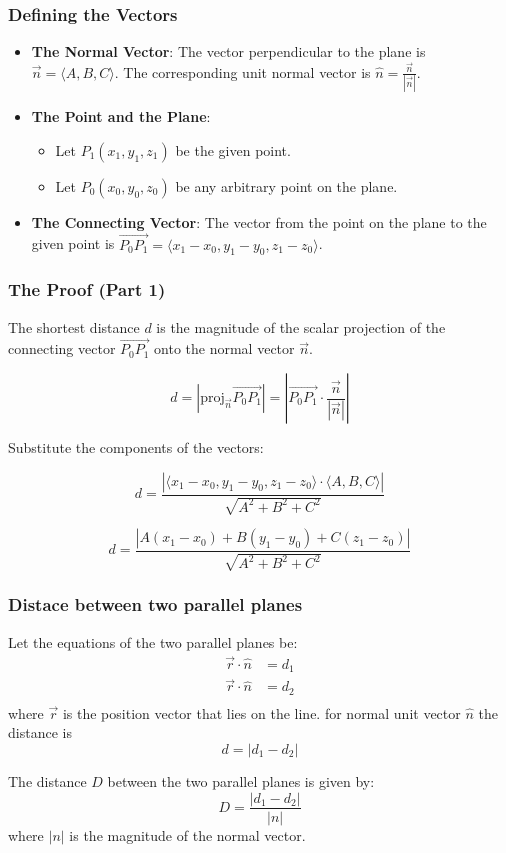 \begin{frame}
    \frametitle{Defining the Vectors}
    \begin{itemize}
        \item \textbf{The Normal Vector}: The vector perpendicular to the plane is $\vec{n} = \langle A, B, C \rangle$. The corresponding unit normal vector is $\hat{n} = \frac{\vec{n}}{|\vec{n}|}$.
        \item \textbf{The Point and the Plane}:
        \begin{itemize}
            \item Let $P_1(x_1, y_1, z_1)$ be the given point.
            \item Let $P_0(x_0, y_0, z_0)$ be any arbitrary point on the plane.
        \end{itemize}
        \item \textbf{The Connecting Vector}: The vector from the point on the plane to the given point is $\vec{P_0P_1} = \langle x_1 - x_0, y_1 - y_0, z_1 - z_0 \rangle$.
    \end{itemize}
\end{frame}

\begin{frame}
    \frametitle{The Proof (Part 1)}
    The shortest distance $d$ is the magnitude of the scalar projection of the connecting vector $\vec{P_0P_1}$ onto the normal vector $\vec{n}$.
    
    \[d = |\text{proj}_{\vec{n}} \vec{P_0P_1}| = \left|\vec{P_0P_1} \cdot \frac{\vec{n}}{|\vec{n}|}\right|\]
    
    Substitute the components of the vectors:
    
    \[d = \frac{|\langle x_1 - x_0, y_1 - y_0, z_1 - z_0 \rangle \cdot \langle A, B, C \rangle|}{\sqrt{A^2 + B^2 + C^2}}\]
    
    \[d = \frac{|A(x_1 - x_0) + B(y_1 - y_0) + C(z_1 - z_0)|}{\sqrt{A^2 + B^2 + C^2}}\]
\end{frame}

\begin{frame}
    \frametitle{Distace between two parallel planes}
    Let the equations of the two parallel planes be:
    \begin{align*}
    \vec{r} \cdot \hat{n} &= d_{1} \\
    \vec{r} \cdot \hat{n} &= d_{2} \\
    \end{align*}
    where \(\vec{r}\) is the position vector that lies on the line.
    for normal unit vector \(\hat{n}\) the distance is 
    \[d = |d_{1} - d_{2}|\]

    The distance \(D\) between the two parallel planes is given by:
    \[D = \frac{|d_{1} - d_{2}|}{|{n}|}\]
    where \(|{n}|\) is the magnitude of the normal vector.

\end{frame}

